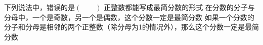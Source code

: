 下列说法中，错误的是\hfill$\left(\qquad\right)$
{正整数都能写成最简分数的形式}
{在分数的分子与分母中，一个是奇数，另一个是偶数，这个分数一定是最简分数}
{如果一个分数的分子和分母是相邻的两个正整数（除分母为1的情况外），那么这个分数一定是最简分数}